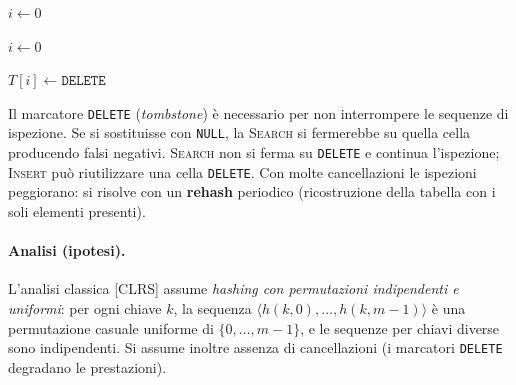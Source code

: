 \begin{algorithm}[H]
	\caption{\textsc{Insert}$(T, o)$}
	$i \leftarrow 0$\;
	\;
\end{algorithm}

\begin{algorithm}[H]
	\caption{\textsc{Search}$(T, k)$}
	$i \leftarrow 0$\;
	\;
\end{algorithm}

\begin{algorithm}[H]
	\caption{\textsc{Delete}$(T, i)$}
	$T[i] \leftarrow \mathtt{DELETE}$ 
\end{algorithm}

\begin{hardnote}
	Il marcatore \texttt{DELETE} (\emph{tombstone}) è necessario per non
	interrompere le sequenze di ispezione. Se si sostituisse con \texttt{NULL},
	la \textsc{Search} si fermerebbe su quella cella producendo falsi negativi.
	\textsc{Search} non si ferma su \texttt{DELETE} e continua l'ispezione;
	\textsc{Insert} può riutilizzare una cella \texttt{DELETE}. Con molte
	cancellazioni le ispezioni peggiorano: si risolve con un \textbf{rehash}
	periodico (ricostruzione della tabella con i soli elementi presenti).
\end{hardnote}

\paragraph{Analisi (ipotesi).}
L'analisi classica [CLRS] assume \emph{hashing con permutazioni indipendenti e
	uniformi}: per ogni chiave $k$, la sequenza
$\langle h(k,0), \ldots, h(k,m-1)\rangle$ è una permutazione casuale uniforme
di $\{0,\ldots,m-1\}$, e le sequenze per chiavi diverse sono indipendenti.
Si assume inoltre assenza di cancellazioni (i marcatori \texttt{DELETE}
degradano le prestazioni).

